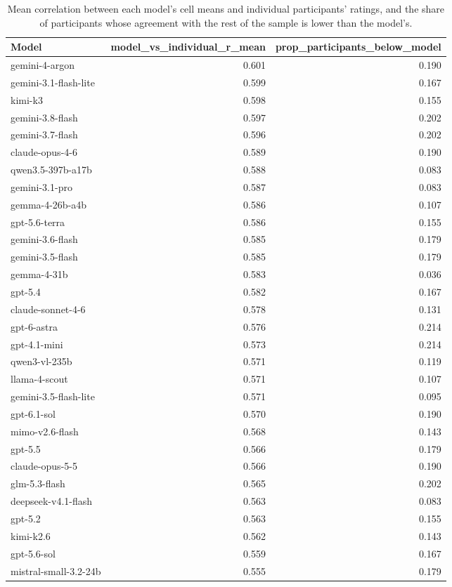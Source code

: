 \begin{table}
\caption{Mean correlation between each model's cell means and individual participants' ratings, and the share of participants whose agreement with the rest of the sample is lower than the model's.}
\begin{tabular}{lrr}
\toprule
Model & model\_vs\_individual\_r\_mean & prop\_participants\_below\_model \\
\midrule
gemini-4-argon & 0.601 & 0.190 \\
gemini-3.1-flash-lite & 0.599 & 0.167 \\
kimi-k3 & 0.598 & 0.155 \\
gemini-3.8-flash & 0.597 & 0.202 \\
gemini-3.7-flash & 0.596 & 0.202 \\
claude-opus-4-6 & 0.589 & 0.190 \\
qwen3.5-397b-a17b & 0.588 & 0.083 \\
gemini-3.1-pro & 0.587 & 0.083 \\
gemma-4-26b-a4b & 0.586 & 0.107 \\
gpt-5.6-terra & 0.586 & 0.155 \\
gemini-3.6-flash & 0.585 & 0.179 \\
gemini-3.5-flash & 0.585 & 0.179 \\
gemma-4-31b & 0.583 & 0.036 \\
gpt-5.4 & 0.582 & 0.167 \\
claude-sonnet-4-6 & 0.578 & 0.131 \\
gpt-6-astra & 0.576 & 0.214 \\
gpt-4.1-mini & 0.573 & 0.214 \\
qwen3-vl-235b & 0.571 & 0.119 \\
llama-4-scout & 0.571 & 0.107 \\
gemini-3.5-flash-lite & 0.571 & 0.095 \\
gpt-6.1-sol & 0.570 & 0.190 \\
mimo-v2.6-flash & 0.568 & 0.143 \\
gpt-5.5 & 0.566 & 0.179 \\
claude-opus-5-5 & 0.566 & 0.190 \\
glm-5.3-flash & 0.565 & 0.202 \\
deepseek-v4.1-flash & 0.563 & 0.083 \\
gpt-5.2 & 0.563 & 0.155 \\
kimi-k2.6 & 0.562 & 0.143 \\
gpt-5.6-sol & 0.559 & 0.167 \\
mistral-small-3.2-24b & 0.555 & 0.179 \\

\end{tabular}
\end{table}
